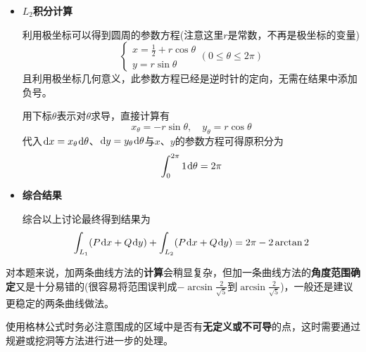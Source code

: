 \documentclass[a4paper,UTF8,fontset=windows,AutoFakeBold]{ctexart}
\newcommand*{\dr}{\hspace{0.07em}\mathrm{d}}
\newcommand*{\note}{\noindent *}
\theoremstyle{ex}
\begin{document}
\begin{framed}
{\begin{itemize}
        可直接写出线段的参数方程
        $$\begin{cases}x=0\\y=t\end{cases}(-1\le t\le1)$$
        用下标$t$表示对$t$求导，直接计算有
        $$x_t=0,\quad y_t=1$$
        代入$\dr x=x_t\dr t$、$\dr y=y_t\dr t$与$x$、$y$的参数方程可得原积分为
        $$\int_{-1}^1\frac{t-\frac{1}{2}}{\frac{1}{4}+t^2}\dr t$$
        利用对称性，将$t$换元为$-t$可发现
        $$\int_{-1}^1\frac{t-\frac{1}{2}}{\frac{1}{4}+t^2}\dr t=\int_{-1}^1\frac{-t-\frac{1}{2}}{\frac{1}{4}+t^2}\dr t$$
        从而$t$的部分积分为0，原积分可写为
        $$-\frac{1}{2}\int_{-1}^1\frac{1}{\frac{1}{4}+t^2}\dr t$$
        利用上册教材3.2节的积分公式，$c>0$时
        $$\int\frac{1}{c^2+z^2}\dr z=\frac{1}{c}\arctan\frac{z}{c}+C$$
        由此可直接得到积分结果
        $$-\frac{1}{2}(2\arctan 2-2\arctan(-2))=-2\arctan2$$

        \item \textbf{$L_2$积分计算}
        
        利用极坐标可以得到圆周的参数方程(注意这里$r$是常数，不再是极坐标的变量)
        $$\begin{cases}x=\frac{1}{2}+r\cos\theta\\y=r\sin\theta\end{cases}(0\le\theta\le2\pi)$$
        且利用极坐标几何意义，此参数方程已经是逆时针的定向，无需在结果中添加负号。

        用下标$\theta$表示对$\theta$求导，直接计算有
        $$x_\theta=-r\sin\theta,\quad y_\theta=r\cos\theta$$
        代入$\dr x=x_\theta\dr\theta$、$\dr y=y_\theta\dr\theta$与$x$、$y$的参数方程可得原积分为
        $$\int_0^{2\pi}1\dr\theta=2\pi$$

        \item \textbf{综合结果}

        综合以上讨论最终得到结果为
        $$\int_{L_1}(P\dr x+Q\dr y)+\int_{L_2}(P\dr x+Q\dr y)=2\pi-2\arctan2$$
    \end{itemize}

    \note 对本题来说，加两条曲线方法的\textbf{计算}会稍显复杂，但加一条曲线方法的\textbf{角度范围确定}又是十分易错的(很容易将范围误判成$-\arcsin\frac{2}{\sqrt5}$到$\arcsin\frac{2}{\sqrt5}$)，一般还是建议更稳定的两条曲线做法。
}
\end{framed}

\note 使用格林公式时务必注意围成的区域中是否有\textbf{无定义或不可导}的点，这时需要通过规避或挖洞等方法进行进一步的处理。
\end{document}

